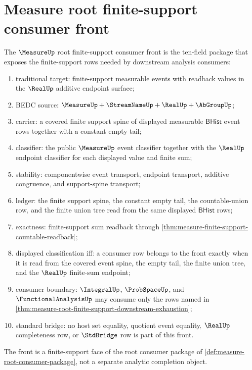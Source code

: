 \section{Measure root finite-support consumer front}
\label{sec:measure-root-finite-support-consumer-front}

\begin{definition}
\label{def:measure-root-finite-support-consumer-front}
The $\MeasureUp$ root finite-support consumer front is the ten-field package
that exposes the finite-support rows needed by downstream analysis consumers:
\begin{enumerate}
  \item traditional target: finite-support measurable events with readback
  values in the $\RealUp$ additive endpoint surface;
  \item BEDC source: $\MeasureUp+\StreamNameUp+\RealUp+\AbGroupUp$;
  \item carrier: a covered finite support spine of displayed measurable
  $\mathsf{BHist}$ event rows together with a constant empty tail;
  \item classifier: the public $\MeasureUp$ event classifier together with
  the $\RealUp$ endpoint classifier for each displayed value and finite sum;
  \item stability: componentwise event transport, endpoint transport,
  additive congruence, and support-spine transport;
  \item ledger: the finite support spine, the constant empty tail, the
  countable-union row, and the finite union tree read from the same displayed
  $\mathsf{BHist}$ rows;
  \item exactness: finite-support sum readback through
  \autoref{thm:measure-finite-support-countable-readback};
  \item displayed classification iff: a consumer row belongs to the front
  exactly when it is read from the covered event spine, the empty tail, the
  finite union tree, and the $\RealUp$ finite-sum endpoint;
  \item consumer boundary: $\IntegralUp$, $\ProbSpaceUp$, and
  $\FunctionalAnalysisUp$ may consume only the rows named in
  \autoref{thm:measure-root-finite-support-downstream-exhaustion};
  \item standard bridge: no host set equality, quotient event equality,
  $\RealUp$ completeness row, or $\StdBridge$ row is part of this front.
\end{enumerate}
The front is a finite-support face of the root consumer package of
\autoref{def:measure-root-consumer-package}, not a separate analytic
completion object.
\end{definition}

